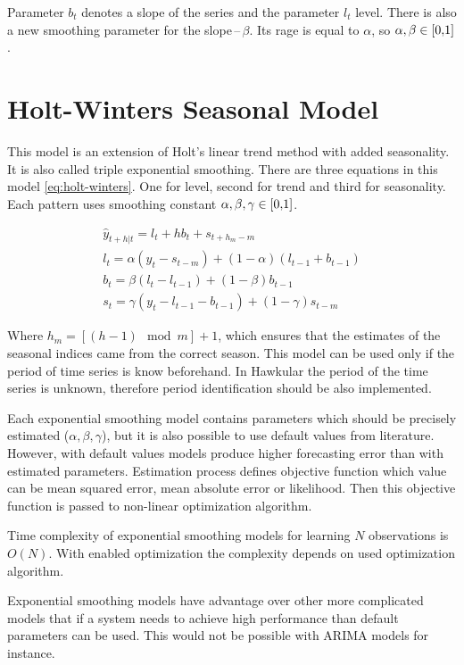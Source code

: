     Parameter $b_t$ denotes a slope of the series and the parameter $l_t$ level. There is also a new smoothing
    parameter for the slope\,--\,$\beta$. Its rage is equal to $\alpha$, so $\alpha,\beta \in \interval[{0,1}]$.

    \section{Holt-Winters Seasonal Model} \label{sec:triple-ex}
    This model is an extension of Holt's linear trend method with added seasonality. It is also called triple
    exponential smoothing. There are three equations in this model \ref{eq:holt-winters}. One for level, second for
    trend and third for seasonality. Each pattern uses smoothing constant $ \alpha,\beta,\gamma \in \interval[{0,1}]$.

    \begin{gather} \label{eq:holt-winters}
        \hat{y}_{t+h|t} = l_{t} + hb_{t} + s_{t+h_m-m}\\ \nonumber
        l_t = \alpha (y_t - s_{t-m}) + (1 - \alpha) (l_{t-1} + b_{t-1}) \\ \nonumber
        b_t = \beta (l_t - l_{t-1}) + (1 - \beta)b_{t-1} \\ \nonumber
        s_t = \gamma (y_t - l_{t-1} - b_{t-1}) + (1-\gamma)s_{t-m}
    \end{gather}

    Where $h_m=[(h-1) \mod m] + 1$, which ensures that the estimates of the seasonal indices came from the correct
    season. This model can be used only if the period of time series is know beforehand. In Hawkular the period  of
    the time series is unknown, therefore period identification should be also implemented.

    Each exponential smoothing model contains parameters which should be precisely estimated ($\alpha, \beta,
    \gamma$), but it is also possible to use default values from literature. However, with default values models produce
    higher forecasting error than with estimated parameters. Estimation process defines objective function which
    value can be mean squared error, mean absolute error or likelihood. Then this objective function is passed to
    non-linear optimization algorithm.

    Time complexity of exponential smoothing models for learning $N$ observations is $O(N)$. With enabled optimization
    the complexity depends on used optimization algorithm.

    Exponential smoothing models have advantage over other more complicated models that if a system needs to achieve high
    performance than default parameters can be used. This would not be possible with ARIMA models for instance.

